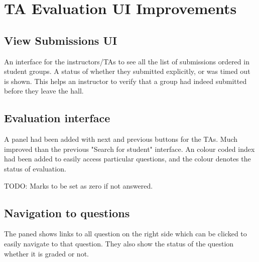 \section{TA Evaluation UI Improvements}

\subsection{View Submissions UI}
An interface for the instructors/TAs to see all the list of submissions ordered in student groups.
A status of whether they submitted explicitly, or was timed out is shown. This helps an instructor to verify that a group had indeed submitted before they leave the hall.

\subsection{Evaluation interface}
A panel had been added with next and previous buttons for the TAs. Much improved than the previous "Search for student" interface. An colour coded index had been added to easily access particular questions, and the colour denotes the status of evaluation.

TODO: Marks to be set as zero if not answered.

\subsection{Navigation to questions}
The paned shows links to all question on the right side which can be clicked to easily navigate to that question. They also show the status of the question whether it is graded or not.